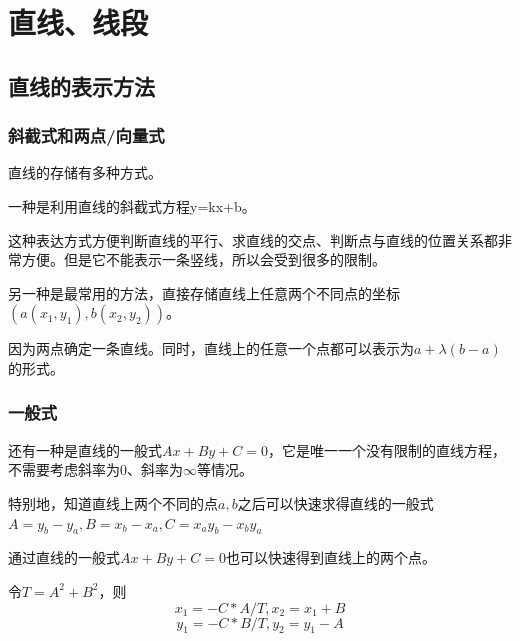\section{直线、线段}

\subsection{直线的表示方法}
\begin{frame}
\frametitle{斜截式和两点/向量式}
\pause
直线的存储有多种方式。\newline \newline

\pause
一种是利用直线的斜截式方程y=kx+b。

这种表达方式方便判断直线的平行、求直线的交点、判断点与直线的位置关系都非常方便。但是它不能表示一条竖线，所以会受到很多的限制。\newline \newline

\pause
另一种是最常用的方法，直接存储直线上任意两个不同点的坐标$(a(x_1,y_1 ),b(x_2,y_2))$。

因为两点确定一条直线。同时，直线上的任意一个点都可以表示为$a+ \lambda (b-a)$的形式。
\end{frame}

\begin{frame}
\frametitle{一般式}
\pause
还有一种是直线的一般式$Ax+By+C=0$，它是唯一一个没有限制的直线方程，不需要考虑斜率为0、斜率为$\infty$等情况。

特别地，知道直线上两个不同的点$a,b$之后可以快速求得直线的一般式$A=y_b-y_a,B=x_b-x_a,C=x_ay_b-x_by_a$

\pause
通过直线的一般式$Ax+By+C=0$也可以快速得到直线上的两个点。

令$T=A^2+B^2$，则
\begin{displaymath}
x_1=-C*A/T,x_2=x_1+B
\end{displaymath}
\begin{displaymath}
y_1=-C*B/T,y_2=y_1-A
\end{displaymath}
\end{frame}

